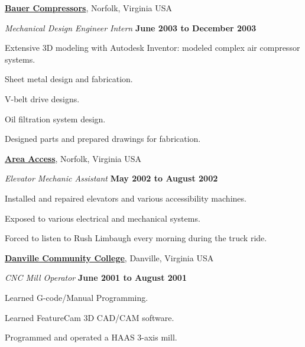 \documentclass[10pt]{article}
\newenvironment{outerlist}[1][\enskip\textbullet]%
        {\begin{itemize}[#1]}{\end{itemize}%
         \vspace{-.6\baselineskip}}
\newenvironment{innerlist}[1][\enskip\textbullet]%
        {\begin{compactitem}[#1]}{\end{compactitem}}
\newcommand{\blankline}{\quad\pagebreak[2]}
\begin{document}
\blankline

\href{http://www.bauercomp.com/}{\textbf{Bauer Compressors}}, Norfolk, Virginia
USA
\begin{outerlist}
  \item[] \textit{Mechanical Design Engineer Intern}%
    \hfill \textbf{June 2003 to December 2003}
  \begin{innerlist}
    \item Extensive 3D modeling with Autodesk Inventor: modeled complex
        air compressor systems.
    \item Sheet metal design and fabrication.
    \item V-belt drive designs.
    \item Oil filtration system design.
    \item Designed parts and prepared drawings for fabrication.
  \end{innerlist}
\end{outerlist}

\blankline

\href{http://www.areaaccess.com/}{\textbf{Area Access}}, Norfolk, Virginia USA
\begin{outerlist}
  \item[] \textit{Elevator Mechanic Assistant}%
    \hfill \textbf{May 2002 to August 2002}
  \begin{innerlist}
    \item Installed and repaired elevators and various accessibility machines.
    \item Exposed to various electrical and mechanical systems.
    \item Forced to listen to Rush Limbaugh every morning during the truck
      ride.
  \end{innerlist}
\end{outerlist}

\blankline

\href{http://www.dcc.vccs.edu/}{\textbf{Danville Community College}}, Danville, Virginia USA
\begin{outerlist}
  \item[] \textit{CNC Mill Operator}%
    \hfill \textbf{June 2001 to August 2001}
  \begin{innerlist}
    \item Learned G-code/Manual Programming.
    \item Learned FeatureCam 3D CAD/CAM software.
    \item Programmed and operated a HAAS 3-axis mill.
  \end{innerlist}
\end{outerlist}
\end{document}

